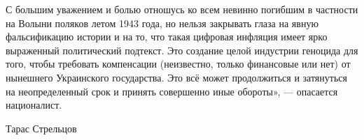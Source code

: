 С большим уважением и болью отношусь ко всем невинно погибшим в частности на
Волыни поляков летом 1943 года, но нельзя закрывать глаза на явную
фальсификацию истории и на то, что такая цифровая инфляция имеет ярко
выраженный политический подтекст. Это создание целой индустрии геноцида для
того, чтобы требовать компенсации (неизвестно, только финансовые или нет) от
нынешнего Украинского государства. Это всё может продолжиться и затянуться на
неопределенный срок и принять совершенно иные обороты», --- опасается
националист.

Тарас Стрельцов 
